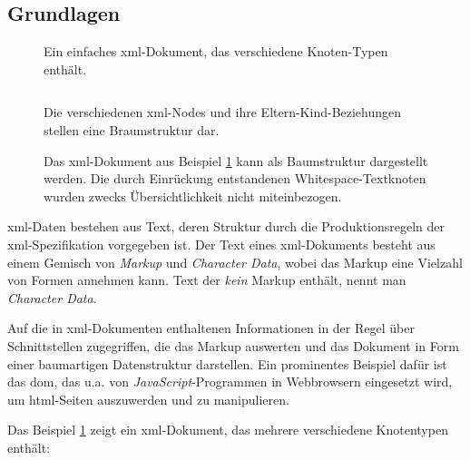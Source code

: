 \subsection{Grundlagen}

\begin{figure}[h!]
    \begin{example} Ein  einfaches \acrshort{xml}-Dokument, das verschiedene Knoten-Typen enthält.

    \label{ex:xmldoc}
    \inputminted{xml}{xmltree.xml}
    \end{example}
\end{figure}

\begin{figure}[h!]
    \begin{example} Die verschiedenen \acrshort{xml}-Nodes und ihre Eltern-Kind-Beziehungen stellen eine Braumstruktur dar.

        \begin{captionbeside}%
            {Das \acrshort{xml}-Dokument aus Beispiel \ref{ex:xmldoc} kann als Baumstruktur dargestellt werden. Die durch Einrückung entstandenen Whitespace-Textknoten wurden zwecks Übersichtlichkeit nicht miteinbezogen.}
            \label{ex:xmltree}
            
        \end{captionbeside}
    \end{example}
\end{figure}

\acrshort{xml}-Daten bestehen aus Text, deren Struktur durch die Produktionsregeln der \acrshort{xml}-Spezifikation vorgegeben ist. Der Text eines \acrshort{xml}-Dokuments besteht aus einem Gemisch von \emph{Markup} und \emph{Character Data}, wobei das Markup eine Vielzahl von Formen annehmen kann. Text der \emph{kein} Markup enthält, nennt man \emph{Character Data}.

Auf die in \acrshort{xml}-Dokumenten enthaltenen Informationen in der Regel über Schnittstellen zugegriffen, die das Markup auswerten und das Dokument in Form einer baumartigen Datenstruktur darstellen. Ein prominentes Beispiel dafür ist das \acrfull{dom}, das u.a. von \emph{JavaScript}-Programmen in Webbrowsern eingesetzt wird, um  \acrshort{html}-Seiten auszuwerden und zu manipulieren.

Das Beispiel \ref{ex:xmldoc} zeigt ein \acrshort{xml}-Dokument, das mehrere verschiedene Knotentypen enthält:


